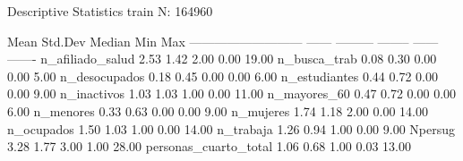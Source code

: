 Descriptive Statistics  
train  
N: 164960  

                              Mean   Std.Dev   Median    Min     Max
--------------------------- ------ --------- -------- ------ -------
           n_afiliado_salud   2.53      1.42     2.00   0.00   19.00
               n_busca_trab   0.08      0.30     0.00   0.00    5.00
              n_desocupados   0.18      0.45     0.00   0.00    6.00
              n_estudiantes   0.44      0.72     0.00   0.00    9.00
                n_inactivos   1.03      1.03     1.00   0.00   11.00
               n_mayores_60   0.47      0.72     0.00   0.00    6.00
                  n_menores   0.33      0.63     0.00   0.00    9.00
                  n_mujeres   1.74      1.18     2.00   0.00   14.00
                 n_ocupados   1.50      1.03     1.00   0.00   14.00
                  n_trabaja   1.26      0.94     1.00   0.00    9.00
                    Npersug   3.28      1.77     3.00   1.00   28.00
      personas_cuarto_total   1.06      0.68     1.00   0.03   13.00
